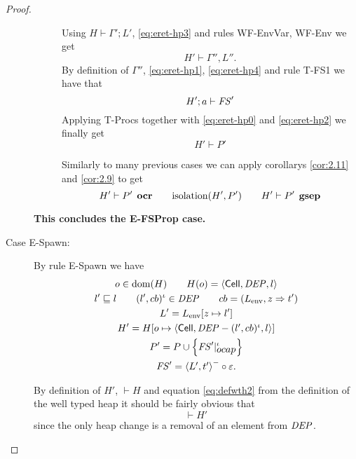 \begin{proof}
\begin{description}
\begin{description}
          Using $H \vdash \Gamma'; L'$, \eqref{eq:eret-hp3} and rules {\sc WF-EnvVar}, {\sc
          WF-Env} we get
          \begin{equation} \label{eq:eret-hp4}
            H' \vdash \Gamma'', L''.
          \end{equation}
          By definition of $\Gamma''$, \eqref{eq:eret-hp1}, \eqref{eq:eret-hp4}
          and rule {\sc T-FS1} we have that
          \begin{equation} \label{eq:eret-hp2}
            H';a \vdash \mathit{FS}'
          \end{equation}
          Applying {\sc T-Procs} together with \eqref{eq:eret-hp0} and
          \eqref{eq:eret-hp2} we finally get
          \begin{equation}
            H' \vdash P'
          \end{equation}

          Similarly to many previous cases we can apply corollarys
          \ref{cor:2.11} and \ref{cor:2.9} to get
          \begin{equation*}
            H' \vdash P' \:\: \mbox{\bf ocr} \quad\quad \mbox{$\mathrm{isolation}$}(H', P') \quad\quad H'
            \vdash P' \:\: \mbox{\bf gsep}
          \end{equation*}
      \end{description}
      {\bf This concludes the {\sc E-FSProp} case.}
      
    \item[Case {\sc E-Spawn}:] By rule {\sc E-Spawn} we have
      \begin{equation}
        \begin{gathered} \label{eq:espawn1}
          o \in \mbox{$\mathrm{dom}$}(H) \quad\quad H(o) = \mbox{$\langle \mbox{$\mathsf{Cell}$}{}, \mathit{DEP}, l \rangle$} \\
          l' \sqsubseteq l \quad\quad (l', cb)^\iota \in \mathit{DEP} \quad\quad cb =
          (L_{\text{env}}, z \Rightarrow t') \\
          L' = L_{\text{env}}[z \mapsto l'] \\
          H' = H[o \mapsto \mbox{$\langle \mbox{$\mathsf{Cell}$}{}, \mathit{DEP} - (l', cb)^\iota, l \rangle$}] \\
          P' = P \cup \left\{ \mathit{FS}'|_{\mbox{$ocap$}}^\iota \right\} \\
          \mathit{FS}' = \mbox{$\langle L', t' \rangle$}^- \circ \varepsilon.
        \end{gathered}
      \end{equation}
      
      By definition of $H'$, $\vdash H$ and equation \eqref{eq:defwth2} from the
      definition of the well typed heap it should be fairly obvious that
      \begin{equation}
        \vdash H'
      \end{equation}
      since the only heap change is a removal of an element from $\mathit{DEP}$. 



\end{description}
\end{proof}
